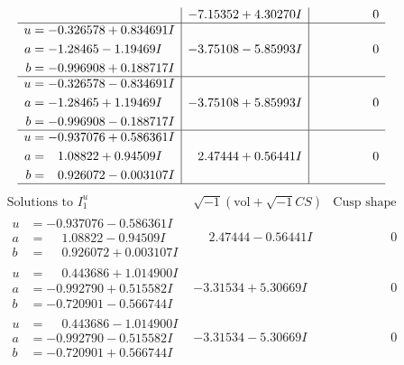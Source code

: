 \documentclass[1p]{elsarticle_modified}
\theoremstyle{definition}
\newcommand{\I}{\sqrt{-1}}
\begin{document}
$$\begin{array}{c|c|c}
 & -7.15352 + 4.30270 I & \phantom{-0.000000 } 0 \\ \hline\begin{aligned}
u &= -0.326578 + 0.834691 I \\
a &= -1.28465 - 1.19469 I \\
b &= -0.996908 + 0.188717 I\end{aligned}
 & -3.75108 - 5.85993 I & \phantom{-0.000000 } 0 \\ \hline\begin{aligned}
u &= -0.326578 - 0.834691 I \\
a &= -1.28465 + 1.19469 I \\
b &= -0.996908 - 0.188717 I\end{aligned}
 & -3.75108 + 5.85993 I & \phantom{-0.000000 } 0 \\ \hline\begin{aligned}
u &= -0.937076 + 0.586361 I \\
a &= \phantom{-}1.08822 + 0.94509 I \\
b &= \phantom{-}0.926072 - 0.003107 I\end{aligned}
 & \phantom{-}2.47444 + 0.56441 I & \phantom{-0.000000 } 0\\
 \hline 
 \end{array}$$\newpage$$\begin{array}{c|c|c}  
\text{Solutions to }I^u_{1}& \I (\text{vol} + \sqrt{-1}CS) & \text{Cusp shape}\\
 \hline 
\begin{aligned}
u &= -0.937076 - 0.586361 I \\
a &= \phantom{-}1.08822 - 0.94509 I \\
b &= \phantom{-}0.926072 + 0.003107 I\end{aligned}
 & \phantom{-}2.47444 - 0.56441 I & \phantom{-0.000000 } 0 \\ \hline\begin{aligned}
u &= \phantom{-}0.443686 + 1.014900 I \\
a &= -0.992790 + 0.515582 I \\
b &= -0.720901 - 0.566744 I\end{aligned}
 & -3.31534 + 5.30669 I & \phantom{-0.000000 } 0 \\ \hline\begin{aligned}
u &= \phantom{-}0.443686 - 1.014900 I \\
a &= -0.992790 - 0.515582 I \\
b &= -0.720901 + 0.566744 I\end{aligned}
 & -3.31534 - 5.30669 I & \phantom{-0.000000 } 0 \\ \hline\begin{aligned}

\end{aligned}
\end{array}$$
\end{document}
